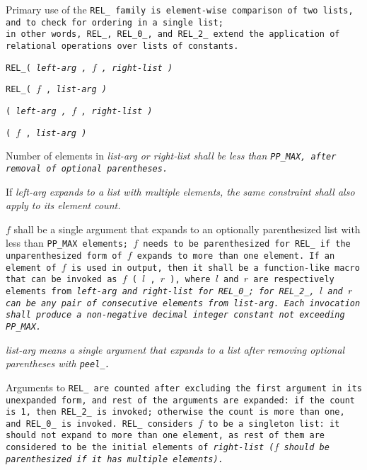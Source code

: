 Primary use of the \tt{REL_} family is element-wise comparison
of two lists, and to check for ordering in a single list;\\
in other words, \tt{REL_}, \tt{REL_0_}, and \tt{REL_2_} extend
the application of relational operations over lists of constants.


 \tt{REL_}\s\s\s\tt{(} \it{left-arg} \tt{,} $f$ \tt{,} \it{right-list} \tt{)}

 \tt{REL_}\s\s\s\tt{(} $f$ \tt{,} \it{list-arg} \tt{)}

\s\tt{(} \it{left-arg} \tt{,} $f$ \tt{,} \it{right-list} \tt{)}

\s\tt{(} $f$ \tt{,} \it{list-arg} \tt{)}


Number of elements in \it{list-arg} or \it{right-list} shall be
less than \tt{PP_MAX}, after removal of optional parentheses.

If \it{left-arg} expands to a list with multiple elements,
the same constraint shall also apply to its element count.

$f$ shall be a single argument that expands to an optionally parenthesized
list with less than \tt{PP_MAX} elements; $f$ needs to be parenthesized for
\tt{REL_} if the unparenthesized form of $f$ expands to more than one element.
If an element of $f$ is used in output, then it shall be a function-like macro
that can be invoked as $f$ \tt{(} $l$ \tt{,} $r$ \tt{)}, where $l$ and $r$ are
respectively elements from \it{left-arg} and \it{right-list} for \tt{REL_0_};
for \tt{REL_2_}, $l$ and $r$ can be any pair
of consecutive elements from \it{list-arg}.
Each invocation shall produce a non-negative
decimal integer constant not exceeding \tt{PP_MAX}.

\note \it{list-arg} means a single argument that expands to
a list after removing optional parentheses with \tt{peel_}.


Arguments to \tt{REL_} are counted after excluding the first
argument in its unexpanded form, and rest of the arguments
are expanded: if the count is 1, then \tt{REL_2_} is invoked;
otherwise the count is more than one, and  \tt{REL_0_} is invoked.
\tt{REL_} considers $f$ to be a singleton list: it should not expand to more
than one element, as rest of them are considered to be the initial elements
of \it{right-list} ($f$ should be parenthesized if it has multiple elements).

